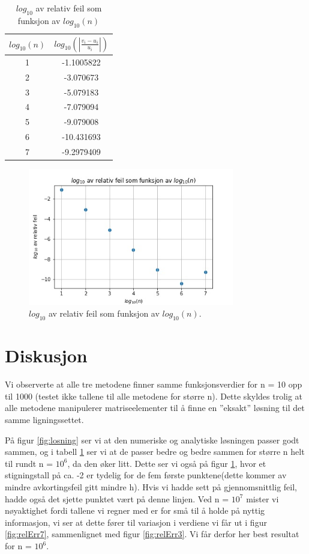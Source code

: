 \documentclass[reprint,english,notitlepage]{revtex4-1}
\begin{document}
	\begin{table}[H]
		\begin{center}
			\caption{$log_{10}$ av relativ feil som funksjon av $log_{10}(n)$}
			\label{tab:relErr}
			\begin{tabular}{|c|c|} \hline
				\textbf{$log_{10}(n)$} & $log_{10}(|\frac{v_i - u_i}{u_i}|)$ \\ \hline
				1 & -1.1005822 \\
				2 & -3.070673 \\
				3 & -5.079183 \\
				4 & -7.079094 \\
				5 & -9.079008 \\
				6 & -10.431693 \\
				7 & -9.2979409 \\ \hline
			\end{tabular}
		\end{center}
	\end{table}
	
	\begin{figure}[H]
		\includegraphics[width=90mm]{../Results/relErrPlot.jpg}
		\caption{$log_{10}$ av relativ feil som funksjon av $log_{10}(n)$.}
		\label{fig:relErrPlot}
	\end{figure}
	
\section{Diskusjon} %
	Vi observerte at alle tre metodene finner samme funksjonsverdier for n = 10 opp til 1000 (testet ikke tallene til alle metodene for større n). Dette skyldes trolig at alle metodene manipulerer matriseelementer til å finne en ''eksakt'' løsning til det samme ligningssettet.
	
	På figur \ref{fig:losning} ser vi at den numeriske og analytiske løsningen passer godt sammen, og i tabell \ref{tab:relErr} ser vi at de passer bedre og bedre sammen for større n helt til rundt n = $10^6$, da den øker litt. Dette ser vi også på figur \ref{fig:relErrPlot}, hvor et stigningstall på ca. -2 er tydelig for de fem første punktene(dette kommer av mindre avkortingsfeil gitt mindre h). Hvis vi hadde sett på gjennomsnittlig feil, hadde også det sjette punktet vært på denne linjen. Ved n = $10^7$ mister vi nøyaktighet fordi tallene vi regner med er for små til å holde på nyttig informasjon, vi ser at dette fører til variasjon i verdiene vi får ut i figur \ref{fig:relErr7}, sammenlignet med figur \ref{fig:relErr3}. Vi får derfor her best resultat for n = $10^6$.
	
\end{document}
